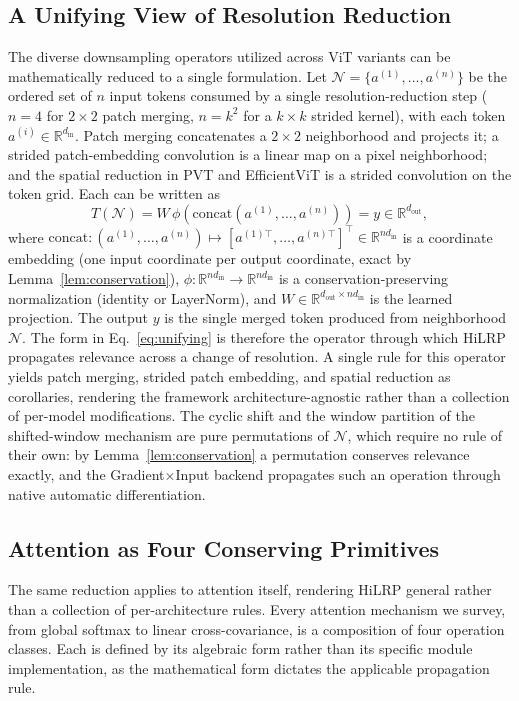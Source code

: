 \documentclass[lettersize,journal]{IEEEtran}
\theoremstyle{definition}
\theoremstyle{plain}
\begin{document}
\subsection{A Unifying View of Resolution Reduction}
\label{sec:unifying}
The diverse downsampling operators utilized across ViT variants can be mathematically reduced to a single formulation. Let $\mathcal{N}=\{a^{(1)},\dots,a^{(n)}\}$ be the ordered set of $n$ input tokens consumed by a single resolution-reduction step ($n{=}4$ for $2{\times}2$ patch merging, $n{=}k^2$ for a $k{\times}k$ strided kernel), with each token $a^{(i)}\in\mathbb{R}^{d_{\mathrm{in}}}$. Patch merging concatenates a $2{\times}2$ neighborhood and projects it; a strided patch-embedding convolution is a linear map on a pixel neighborhood; and the spatial reduction in PVT and EfficientViT is a strided convolution on the token grid. Each can be written as
\begin{equation}
\label{eq:unifying}
T(\mathcal{N}) = W\,\phi\!\left(\mathrm{concat}(a^{(1)},\dots,a^{(n)})\right) = y \in \mathbb{R}^{d_{\mathrm{out}}},
\end{equation}
where $\mathrm{concat}:(a^{(1)},\dots,a^{(n)})\mapsto [a^{(1)\top},\dots,a^{(n)\top}]^\top \in \mathbb{R}^{nd_{\mathrm{in}}}$ is a coordinate embedding (one input coordinate per output coordinate, exact by Lemma~\ref{lem:conservation}), $\phi:\mathbb{R}^{nd_{\mathrm{in}}}\to\mathbb{R}^{nd_{\mathrm{in}}}$ is a conservation-preserving normalization (identity or LayerNorm), and $W\in\mathbb{R}^{d_{\mathrm{out}}\times nd_{\mathrm{in}}}$ is the learned projection. The output $y$ is the single merged token produced from neighborhood $\mathcal{N}$. The form in Eq.~\eqref{eq:unifying} is therefore the operator through which HiLRP propagates relevance across a change of resolution. A single rule for this operator yields patch merging, strided patch embedding, and spatial reduction as corollaries, rendering the framework architecture-agnostic rather than a collection of per-model modifications. The cyclic shift and the window partition of the shifted-window mechanism are pure permutations of $\mathcal{N}$, which require no rule of their own: by Lemma~\ref{lem:conservation} a permutation conserves relevance exactly, and the Gradient$\times$Input backend propagates such an operation through native automatic differentiation.

\subsection{Attention as Four Conserving Primitives}
\label{sec:primitives}
The same reduction applies to attention itself, rendering HiLRP general rather than a collection
of per-architecture rules. Every attention mechanism we survey, from global softmax to linear 
cross-covariance, is a composition of four operation classes. Each is defined by its algebraic
form rather than its specific module implementation, as the mathematical form dictates the
applicable propagation rule.
\end{document}
